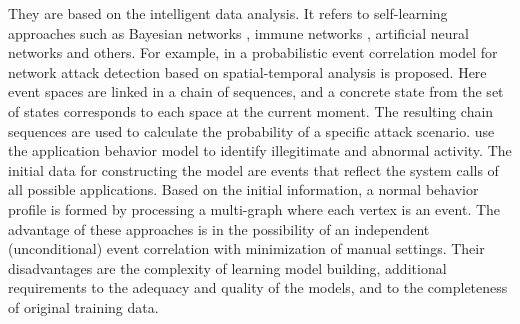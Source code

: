 They are based on the intelligent data analysis. It refers to self-learning approaches such as Bayesian networks \textcite{bursztein2009using} \textcite{dantu2009network} \textcite{fedorchenko2017correlation}, immune networks \textcite{tiffany2002survey} \textcite{xu_2006}, artificial neural networks \textcite{elshoush2011alert} \textcite{kou2012evaluation} and others. For example, in \textcite{Jiang_2004} a probabilistic event correlation model for network attack detection based on spatial-temporal analysis is proposed. Here event spaces are linked in a chain of
sequences, and a concrete state from the set of states corresponds to each space at
the current moment. The resulting chain sequences are used to calculate the probability of a specific attack scenario. \textcite{davis2017resident} use the application behavior
model to identify illegitimate and abnormal activity. The initial data for constructing
the model are events that reflect the system calls of all possible applications. Based
on the initial information, a normal behavior profile is formed by processing a
multi-graph where each vertex is an event.
The advantage of these approaches is in the possibility of an independent
(unconditional) event correlation with minimization of manual settings. Their disadvantages are the complexity of learning model building, additional requirements
to the adequacy and quality of the models, and to the completeness of original
training data.
\fi

